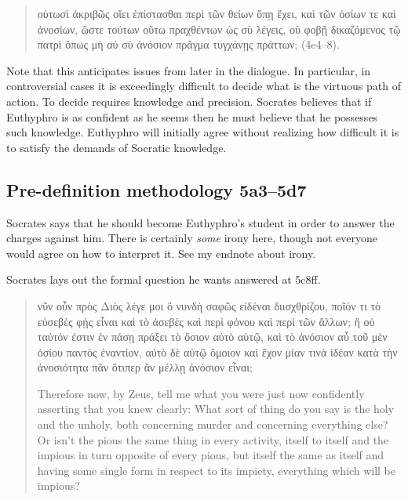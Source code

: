 \documentclass[11pt]{article}
\begin{document}
\begin{quote}

    {\g
    οὑτωσὶ ἀκριβῶς οἴει ἐπίστασθαι περὶ τῶν θείων ὅπῃ ἔχει, καὶ τῶν ὁσίων τε καὶ ἀνοσίων, ὥστε τούτων οὕτω πραχθέντων ὡς σὺ λέγεις, οὐ φοβῇ δικαζόμενος τῷ πατρὶ ὅπως μὴ αὐ σὺ ἀνόσιον πρᾶγμα τυγχάνῃς πράττων;
    } (4e4--8).
    
\end{quote}

Note that this anticipates issues from later in the dialogue.  In particular, in controversial cases it is exceedingly difficult to decide what is the virtuous path of action. To decide requires knowledge and precision.  Socrates believes that if Euthyphro is as confident as he seems then he must believe that he possesses such knowledge.  Euthyphro will initially agree without realizing how difficult it is to satisfy the demands of Socratic knowledge.


\subsection{Pre-definition methodology 5a3--5d7}

Socrates says that he should become Euthyphro's student in order to answer the charges against him.  There is certainly \emph{some} irony here, though not everyone would agree on how to interpret it.  See my endnote about irony.

Socrates lays out the formal question he wants answered at 5c8ff.

\begin{quote}

    {\g
    νῦν οὖν πρὸς Διὸς λέγε μοι ὃ νυνδὴ σαφῶς εἰδέναι διισχθρίζου, ποῖόν τι τὸ εὐσεβὲς φῂς εἶναι καὶ τὸ ἀσεβὲς καὶ περὶ φόνου καὶ περὶ τῶν ἄλλων; ἢ οὐ ταὐτόν ἐστιν ἐν πάσῃ πράξει τὸ ὅσιον αὐτὸ αὑτῷ, καὶ τὸ ἀνόσιον αὖ τοῦ μὲν ὁσίου παντὸς ἐναντίον, αὐτὸ δὲ αὑτῷ ὅμοιον καὶ ἔχον μίαν τινὰ ἰδέαν κατὰ τὴν ἀνοσιότητα πᾶν ὅτιπερ ἂν μέλλῃ ἀνόσιον εἶναι;
    }

    Therefore now, by Zeus, tell me what you were just now confidently asserting that you knew clearly: What sort of thing do you say is the holy and the unholy, both concerning murder and concerning everything else? Or isn't the pious the same thing in every activity, itself to itself and the impious in turn opposite of every pious, but itself the same as itself and having some single form in respect to its impiety, everything which will be impious?

\end{quote}
\end{document}
